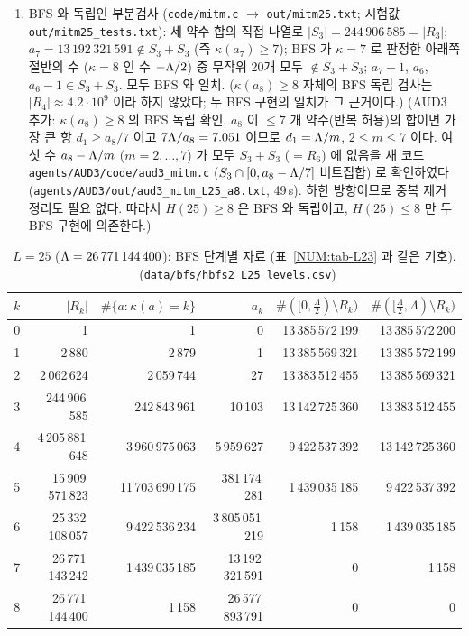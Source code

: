 \begin{theorem}[수치 결과]
\begin{enumerate}[label=(\arabic*)]
\item BFS 와 독립인 부분검사 (\texttt{code/mitm.c} $\to$ \texttt{out/mitm25.txt}; 시험값 \texttt{out/mitm25\_tests.txt}): 세 약수 합의 직접 나열로
$|S_3|=244\,906\,585=|R_3|$; $a_7=13\,192\,321\,591\notin S_3+S_3$ (즉 $\kappa(a_7)\ge7$); BFS 가 $\kappa=7$ 로 판정한 아래쪽 절반의 수 ($\kappa=8$ 인 수 $-\Lambda/2$) 중 무작위 20개 모두 $\notin S_3+S_3$;
$a_7-1$, $a_6$, $a_6-1\in S_3+S_3$. 모두 BFS 와 일치. ($\kappa(a_8)\ge8$ 자체의 BFS 독립 검사는 $|R_4|\approx4.2\cdot10^9$ 이라 하지 않았다; 두 BFS 구현의 일치가 그 근거이다.)
(AUD3 추가: $\kappa(a_8)\ge8$ 의 BFS 독립 확인. $a_8$ 이 $\le7$ 개 약수(반복 허용)의 합이면 가장 큰 항 $d_1\ge a_8/7$ 이고
$7\Lambda/a_8=7.051$ 이므로 $d_1=\Lambda/m$, $2\le m\le7$ 이다. 여섯 수 $a_8-\Lambda/m$ ($m=2,\dots,7$) 가 모두 $S_3+S_3$ ($=R_6$) 에 없음을
새 코드 \texttt{agents/AUD3/code/aud3\_mitm.c} ($S_3\cap[0,a_8-\Lambda/7]$ 비트집합) 로 확인하였다 (\texttt{agents/AUD3/out/aud3\_mitm\_L25\_a8.txt}, 49\,s).
하한 방향이므로 중복 제거 정리도 필요 없다. 따라서 $H(25)\ge8$ 은 BFS 와 독립이고, $H(25)\le8$ 만 두 BFS 구현에 의존한다.)
\end{enumerate}
\end{theorem}

\begin{table}[ht]\centering\small
\begin{tabular}{rrrrrr}
\toprule
$k$ & $|R_k|$ & $\#\{a:\kappa(a)=k\}$ & $a_k$ & $\#([0,\frac{\Lambda}{2})\setminus R_k)$ & $\#([\frac{\Lambda}{2},\Lambda)\setminus R_k)$\\
\midrule
0 & 1 & 1 & 0 & 13\,385\,572\,199 & 13\,385\,572\,200\\
1 & 2\,880 & 2\,879 & 1 & 13\,385\,569\,321 & 13\,385\,572\,199\\
2 & 2\,062\,624 & 2\,059\,744 & 27 & 13\,383\,512\,455 & 13\,385\,569\,321\\
3 & 244\,906\,585 & 242\,843\,961 & 10\,103 & 13\,142\,725\,360 & 13\,383\,512\,455\\
4 & 4\,205\,881\,648 & 3\,960\,975\,063 & 5\,959\,627 & 9\,422\,537\,392 & 13\,142\,725\,360\\
5 & 15\,909\,571\,823 & 11\,703\,690\,175 & 381\,174\,281 & 1\,439\,035\,185 & 9\,422\,537\,392\\
6 & 25\,332\,108\,057 & 9\,422\,536\,234 & 3\,805\,051\,219 & 1\,158 & 1\,439\,035\,185\\
7 & 26\,771\,143\,242 & 1\,439\,035\,185 & 13\,192\,321\,591 & 0 & 1\,158\\
8 & 26\,771\,144\,400 & 1\,158 & 26\,577\,893\,791 & 0 & 0\\
\bottomrule
\end{tabular}
\caption{$L=25$ ($\Lambda=26\,771\,144\,400$): BFS 단계별 자료 (표~\ref{NUM:tab-L23} 과 같은 기호). \NUMERIC\ (\texttt{data/bfs/hbfs2\_L25\_levels.csv})}\label{NUM:tab-L25}
\end{table}

